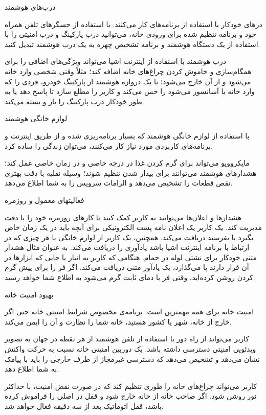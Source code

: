  درب‌های هوشمند

درهای خودکار با استفاده از برنامه‌های  کار می‌کنند. با استفاده از حسگرهای تلفن همراه خود و برنامه تنظیم شده برای ورودی خانه، می‌توانید درب پارکینگ و درب امنیتی را با استفاده از یک دستگاه هوشمند و برنامه تشخیص چهره به یک درب هوشمند تبدیل کنید.

درب هوشمند با استفاده از اینترنت اشیا می‌تواند ویژگی‌های اضافی را برای همگام‌سازی و خاموش کردن چراغ‌های خانه اضافه کند؛ مثلاً وقتی شخصی وارد خانه می‌شود و از آن خارج می‌شود؛ یا یک دروازه هوشمند از پارکینگ خودرو، فردی را که وارد خانه یا آسانسور می‌شود را حس می‌کند و کاربر را مطلع سازد تا پاسخ دهد یا به طور خودکار درب پارکینگ را باز و بسته می‌کند.

 لوازم خانگی هوشمند

با استفاده از لوازم خانگی هوشمند که بسیار برنامه‌ریزی شده و از طریق اینترنت و برنامه‌های کاربردی مورد نیاز کار می‌کنند، می‌توان زندگی را ساده کرد.

مایکروویو می‌تواند برای گرم کردن غذا در درجه خاصی و در زمان خاصی عمل کند؛ هشدارهای هوشمند می‌توانند برای بیدار شدن تنظیم شوند؛ وسیله نقلیه با دقت بهتری نقص قطعات را تشخیص می‌دهد و الزامات سرویس را به شما اطلاع می‌دهد.

 فعالیتهای معمول و روزمره

هشدارها و اعلان‌ها می‌توانند به کاربر کمک کنند تا کارهای روزمره خود را با دقت مدیریت کند. یک کاربر یک اعلان نامه پست الکترونیکی برای آنچه باید در یک زمان خاص بگیرد یا بفرستد دریافت می‌کند. همچنین، یک کاربر از لوازم خانگی یا هر چیزی که در ارتباط با برنامه اینترنت اشیا باشد یادآوری را دریافت می‌کند. به عنوان مثال هشدار متنی خودکار برای نشتی لوله در حمام. هنگامی که کاربر به انیار یا جایی که ابزارها در آن قرار دارند پا می‌گذارد، یک یادآور متنی دریافت می‌کند. اگر فر را برای پیش گرم کردن روشن کرده‌اید، وقتی فر با دمای ثابت گرم می‌شود به اطلاع شما خواهد رسید.

 بهبود امنیت خانه

امنیت خانه برای همه مهمترین است. برنامه‌ی مخصوص شرایط امنیتی خانه حتی اگر خارج از خانه، شهر یا کشور هستید، خانه شما را نظارت و آن را ایمن می‌کند.

کاربر می‌تواند از راه دور با استفاده از تلفن هوشمند از هر نقطه در جهان به تصویر ویدئویی امنیتی دسترسی داشته باشد. یک دوربین امنیتی خانه نسبت به حرکت واکنش نشان می‌دهد و تشخیص می‌دهد که دسترسی غیرمجاز از طرف خارجی را باید با پیامک به شما اطلاع دهد.

کاربر می‌تواند چراغ‌های خانه را طوری تنظیم کند که در صورت نقض امنیت، با حداکثر نور روشن شود. اگر صاحب خانه از خانه خارج شود و قفل در اصلی را فراموش کرده باشد، قفل اتوماتیک بعد از سه دقیقه فعال خواهد شد.

